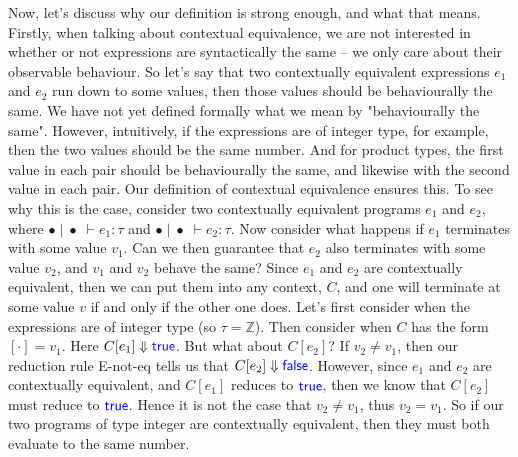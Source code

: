 \documentclass[twoside,11pt,openright]{report}
\theoremstyle{definition}
\newcommand{\Keyword}[1]{{\color{blue} \mathsf{#1}}}
\newcommand{\expr}{e}
\newcommand{\val}{v}
\newcommand{\True}{\Keyword{true}}
\newcommand{\False}{\Keyword{false}}
\newcommand{\empctx}{[\cdot]}
\newcommand{\ctx}{C}
\newcommand{\Tint}{\mathbb{Z}}
\newcommand{\typ}{\tau}
\newcommand{\emptenv}{\bullet}
\newcommand{\empvenv}{\bullet}
\newcommand{\jdg}[4]{#1 \; | \; #2 \; \vdash #3 : #4}
\begin{document}
Now, let's discuss why our definition is strong enough, and what that means. Firstly, when talking about contextual equivalence, we are not interested in whether or not expressions are syntactically the same – we only care about their observable behaviour. So let's say that two contextually equivalent expressions $\expr_1$ and $\expr_2$ run down to some values, then those values should be behaviourally the same. We have not yet defined formally what we mean by "behaviourally the same". However, intuitively, if the expressions are of integer type, for example, then the two values should be the same number. And for product types, the first value in each pair should be behaviourally the same, and likewise with the second value in each pair. Our definition of contextual equivalence ensures this. To see why this is the case, consider two contextually equivalent programs $\expr_1$ and $\expr_2$, where $\jdg{\emptenv}{\empvenv}{\expr_1}{\typ}$ and $\jdg{\emptenv}{\empvenv}{\expr_2}{\typ}$.
Now consider what happens if $\expr_1$ terminates with some value $\val_1$. Can we then guarantee that $\expr_2$ also terminates with some value $\val_2$, and $\val_1$ and $\val_2$ behave the same? Since $\expr_1$ and $\expr_2$ are contextually equivalent, then we can put them into any context, $\ctx$, and one will terminate at some value $\val$ if and only if the other one does.
Let's first consider when the expressions are of integer type (so $\typ = \Tint$). Then consider when $\ctx$ has the form $\empctx = \val_1$. Here $\ctx[\expr_1] \Downarrow \True$. But what about $\ctx[\expr_2]$? If $\val_2 \neq \val_1$, then our reduction rule E-not-eq tells us that $\ctx[\expr_2] \Downarrow \False$. However, since $\expr_1$ and $\expr_2$ are contextually equivalent, and $\ctx[\expr_1]$ reduces to $\True$, then we know that $\ctx[\expr_2]$ must reduce to $\True$. Hence it is not the case that $\val_2 \neq \val_1$, thus $\val_2 = \val_1$. So if our two programs of type integer are contextually equivalent, then they must both evaluate to the same number.
\end{document}
